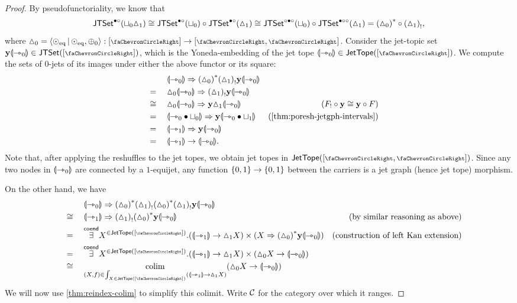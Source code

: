 \documentclass[a4paper]{memoir}
\begin{document}
\begin{proof}
	By pseudofunctoriality, we know that
	\[
		\mathsf{JTSet}^{\bullet \circ}({\sqcup}_0 {\vartriangle}_1)
		\cong \mathsf{JTSet}^{\bullet \circ}({\sqcup}_0) \circ \mathsf{JTSet}^{\bullet \circ}({\vartriangle}_1)
		\cong \mathsf{JTSet}^{\circ \bullet \circ}({\sqcup}_0) \circ \mathsf{JTSet}^{\bullet \circ \circ}({\vartriangle}_1)
		= {({\vartriangle}_0)}^* \circ {({\vartriangle}_1)}_!,
	\]
	where $\cohdisc_0 = \reshlist{\nonpol_\eqtydeg}{\nonpol_\eqtydeg, \pospol_0} : [\ypolar] \to [\ypolar, \ypolar]$.
	Consider the jet-topic set $\yoneda \rival{\jetsym_0} \in \jtset{[\ypolar]}$, which is the Yoneda-embedding of the jet tope $\rival{\jetsym_0} \in \jettope{[\ypolar]}$.
	We compute the sets of 0-jets of its images under either the above functor or its square:
	\begin{align*}
		&\quad\mathrel{\phantom{=}}\quad
		\DSub{\rival{\jetsym_0}}{\fpsh{(\cohdisc_0)} \lpsh{(\cohdisc_1)} \yoneda \rival{\jetsym_0}} \\
		&\quad=\quad \DSub{\cohdisc_0 \rival{\jetsym_0}}{\lpsh{(\cohdisc_1)} \yoneda \rival{\jetsym_0}} \\
		&\quad\cong\quad \DSub{\cohdisc_0 \rival{\jetsym_0}}{\yoneda \cohdisc_1 \rival{\jetsym_0}}
		& \text{($\lpsh F \circ \yoneda \cong \yoneda \circ F$)} \\
		&\quad=\quad \DSub{\rival{\jetsym_0 \oriof \cohfget_0}}{\yoneda \rival{\jetsym_0 \oriof \cohfget_1}}
		& \text{(\cref{thm:poresh-jetgph-intervals})} \\
		&\quad=\quad \DSub{\rival{\jetsym_1}}{\yoneda \rival{\jetsym_0}} \\
		&\quad=\quad \rival{\jetsym_1} \to \rival{\jetsym_0}.
	\end{align*}
	Note that, after applying the reshuffles to the jet topes, we obtain jet topes in $\jettope{[\ypolar, \ypolar]}$.
	Since any two nodes in ${\llparenthesis {\rightarrowtriangle}_0 \rrparenthesis}$ are connected by a $1$-equijet, any function $\mathopen{}\left\{ 0, 1 \right\}\mathclose{} \to \mathopen{}\left\{ 0, 1 \right\}\mathclose{}$ between the carriers is a jet graph (hence jet tope) morphism.
	
	On the other hand, we have
	\begin{align*}
		&\quad\mathrel{\phantom{=}}\quad
		\DSub{\rival{\jetsym_0}}{\fpsh{(\cohdisc_0)} \lpsh{(\cohdisc_1)} \fpsh{(\cohdisc_0)} \lpsh{(\cohdisc_1)} \yoneda \rival{\jetsym_0}} \\
		&\quad\cong\quad \DSub{\rival{\jetsym_1}}{\lpsh{(\cohdisc_1)} \fpsh{(\cohdisc_0)} \yoneda \rival{\jetsym_0}}
		& \text{(by similar reasoning as above)} \\
		&\quad=\quad
		\existscoend X^{{}\in \jettope{[\ypolar]}}.(\rival{\jetsym_1} \to \cohdisc_1 X) \times (\DSub{X}{\fpsh{(\cohdisc_0)} \yoneda \rival{\jetsym_0}})
		& \text{(construction of left Kan extension)} \\
		&\quad=\quad
		\existscoend X^{{}\in \jettope{[\ypolar]}}.(\rival{\jetsym_1} \to \cohdisc_1 X) \times (\cohdisc_0 X \to \rival{\jetsym_0}) \\
		&\quad\cong\quad
		\colim_{(X, f) \in \int_{X \in \jettope{[\ypolar]}} (\rival{\jetsym_1} \to \cohdisc_1 X)}
		(\cohdisc_0 X \to \rival{\jetsym_0})
	\end{align*}
	We will now use \cref{thm:reindex-colim} to simplify this colimit.
	Write ${\mathcal{C}}$ for the category over which it ranges.
	

\end{proof}
\end{document}
